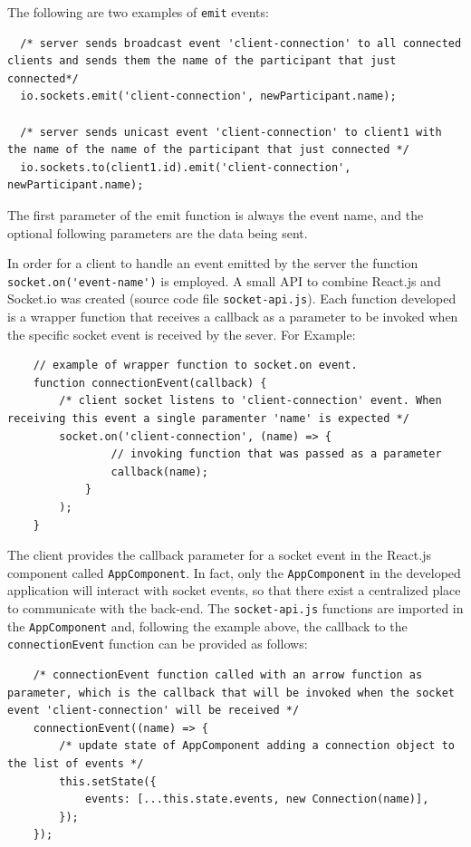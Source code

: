 The following are two examples of \lstinline{emit} events: 
\begin{lstlisting}
  /* server sends broadcast event 'client-connection' to all connected clients and sends them the name of the participant that just connected*/
  io.sockets.emit('client-connection', newParticipant.name);
  
  /* server sends unicast event 'client-connection' to client1 with the name of the name of the participant that just connected */
  io.sockets.to(client1.id).emit('client-connection', newParticipant.name);
\end{lstlisting}

The first parameter of the emit function is always the event name, and the optional following parameters are the data being sent. \newline

In order for a client to handle an event emitted by the server the function \lstinline{socket.on('event-name')} is employed. A small API to combine React.js and Socket.io was created (source code file \lstinline{socket-api.js}). Each function developed is a wrapper function that receives a callback as a parameter to be invoked when the specific socket event is received by the sever. For Example: 
\begin{lstlisting}
    // example of wrapper function to socket.on event.
    function connectionEvent(callback) {
        /* client socket listens to 'client-connection' event. When receiving this event a single paramenter 'name' is expected */
        socket.on('client-connection', (name) => {
                // invoking function that was passed as a parameter
                callback(name);
            }
        );
    }
\end{lstlisting}

The client provides the callback parameter for a socket event in the React.js component called \lstinline{AppComponent}. In fact, only the \lstinline{AppComponent} in the developed application will interact with socket events, so that there exist a centralized place to communicate with the back-end. The \lstinline{socket-api.js} functions are imported in the \lstinline{AppComponent} and, following the example above, the callback to the \lstinline{connectionEvent} function can be provided as follows: 
\begin{lstlisting}
    /* connectionEvent function called with an arrow function as parameter, which is the callback that will be invoked when the socket event 'client-connection' will be received */
    connectionEvent((name) => {
        /* update state of AppComponent adding a connection object to the list of events */
        this.setState({
            events: [...this.state.events, new Connection(name)],
        });
    });
\end{lstlisting}

